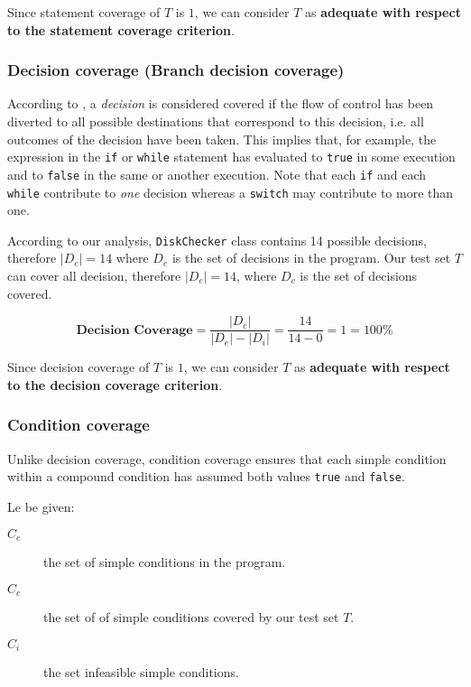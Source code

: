 \documentclass[conference, onecolumn]{IEEEtran}
\newcommand{\abs}[1]{\left|#1\right|}
\begin{document}
Since statement coverage of $T$ is $1$, we can consider $T$ as \textbf{adequate with respect to the statement coverage criterion}.

\subsubsection{Decision coverage (Branch decision coverage)}

According to \cite{FoundationSoftwareTesting}, a \textit{decision} is considered covered if the flow of control has been diverted to all possible destinations that correspond to this decision, i.e. all outcomes of the decision have been taken. This implies that, for example, the expression in the \texttt{if} or \texttt{while} statement has evaluated to \texttt{true} in some execution and to \texttt{false} in the same or another execution. Note that each \texttt{if} and each \texttt{while} contribute to \textit{one} decision whereas a \texttt{switch} may contribute to more than one.

According to our analysis, \texttt{DiskChecker} class contains 14 possible decisions, therefore $\abs{D_e} = 14$ where $D_e$ is the set of decisions in the program. Our test set $T$ can cover all decision, therefore $\abs{D_c} = 14$, where $D_c$ is the set of decisions covered.

\begin{equation} 
\textbf{Decision Coverage} = \dfrac{\abs{D_c}}{\abs{D_e} - \abs{D_i}} = \dfrac{14}{14-0} = 1 = 100\%
\end{equation}

Since decision coverage of $T$ is $1$, we can consider $T$ as \textbf{adequate with respect to the decision coverage criterion}.

\subsubsection{Condition coverage}

Unlike decision coverage, condition coverage ensures that each simple condition within a compound condition has assumed both values \texttt{true} and \texttt{false}. 

Le be given:

\begin{description}
\item[$C_e$] the set of simple conditions in the program.
\item[$C_c$] the set of of simple conditions covered  by our test set $T$.
\item[$C_i$] the set infeasible simple conditions.
\end{description}
\end{document}
